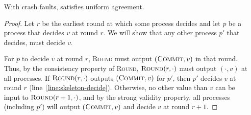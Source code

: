 \begin{theorem}\label{thm:crash-agreement}
    With crash faults,  satisfies uniform agreement.
\end{theorem}
\begin{proof}
    Let $r$ be the earliest round at which some process decides and let $p$ be a process that decides $v$ at round $r$. We will show that any other process $p'$ that decides, must decide $v$. 
    
    For $p$ to decide $v$ at round $r$, \textsc{Round} must output $(\textsc{Commit}, v)$ in that round. Thus, by the consistency property of \textsc{Round}, $\textsc{Round}(r,\cdot)$ must output $(\cdot, v)$ at all processes. If $\textsc{Round}(r,\cdot)$ outputs $(\textsc{Commit}, v)$ for $p'$, then $p'$ decides $v$ at round $r$ (line~\ref{line:skeleton-decide}). Otherwise, no other value than $v$ can be input to $\textsc{Round}(r+1,\cdot)$, and by the strong validity property, all processes (including $p'$) will output $(\textsc{Commit}, v)$ and decide $v$ at round $r+1$.
\end{proof}

